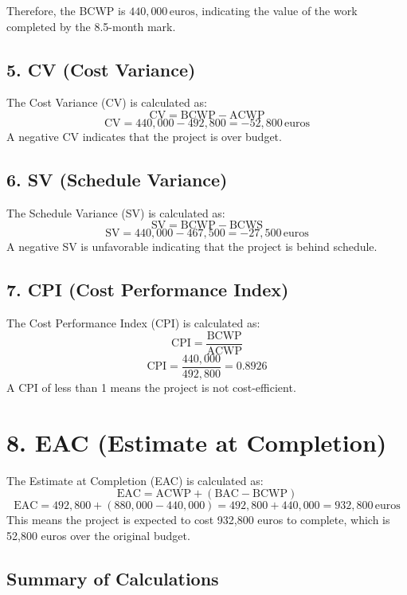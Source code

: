 \documentclass[12pt]{article} %
\begin{document}
Therefore, the BCWP is \( 440,000 \, \text{euros} \), indicating the value of the work completed by the 8.5-month mark.



\subsection*{5. CV (Cost Variance)}
The Cost Variance (CV) is calculated as:
\[
\text{CV} = \text{BCWP} - \text{ACWP}
\]
\[
\text{CV} = 440,000 - 492,800 = -52,800 \, \text{euros}
\]
A negative CV indicates that the project is over budget.

\subsection*{6. SV (Schedule Variance)}
The Schedule Variance (SV) is calculated as:
\[
\text{SV} = \text{BCWP} - \text{BCWS}
\]
\[
\text{SV} = 440,000 - 467,500 = -27,500 \, \text{euros}
\]
A negative SV is unfavorable indicating that the project is behind schedule.

\subsection*{7. CPI (Cost Performance Index)}
The Cost Performance Index (CPI) is calculated as:
\[
\text{CPI} = \frac{\text{BCWP}}{\text{ACWP}}
\]
\[
\text{CPI} = \frac{440,000}{492,800} = 0.8926
\]
A CPI of less than 1 means the project is not cost-efficient.

\section*{8. EAC (Estimate at Completion)}
The Estimate at Completion (EAC) is calculated as:
\[
\text{EAC} = \text{ACWP} + (\text{BAC} - \text{BCWP})
\]
\[
\text{EAC} = 492,800 + (880,000 - 440,000) = 492,800 + 440,000 = 932,800 \, \text{euros}
\]
This means the project is expected to cost 932,800 euros to complete, which is 52,800 euros over the original budget.

\subsection*{Summary of Calculations}
\end{document}
